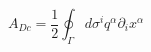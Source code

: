 \begin{equation}
\label{diripart}
A_{Dc}=\frac{1}{2}\oint_{\Gamma} d\sigma^iq^{\alpha}\partial_ix^{\alpha} 
\end{equation}

